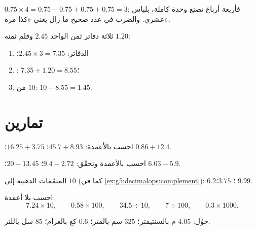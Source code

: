 \begin{example}\label{ex:g5:decimalops:mult}
$0.75 \times 4 = 0.75 + 0.75 + 0.75 + 0.75 = 3$: فأربعة أرباع تصنع
وحدة كاملة، بلباس عشري. والضرب في عدد صحيح ما زال
يعني «كذا مرة».
\end{example}

\begin{example}[التسوّق]\label{ex:g5:decimalops:shopping}
ثلاثة دفاتر ثمن الواحد $2.45$ وقلم ثمنه $1.20$:
\begin{enumerate}
  \item الدفاتر: $2.45 \times 3 = 7.35$؛
  \item {}: $7.35 + 1.20 = 8.55$؛
  \item {} من $10$: $10 - 8.55 = 1.45$.
\end{enumerate}
\end{example}

\section{تمارين}

\begin{exercise}[$\star$]\label{exo:g5:decimalops:1}
احسب بالأعمدة: $45.7 + 8.93$؛ \quad $16.25 + 3.75$؛ \quad
$0.86 + 12.4$.
\end{exercise}

\begin{exercise}[$\star$]\label{exo:g5:decimalops:2}
احسب بالأعمدة وتحقّق: $9.4 - 2.72$؛ \quad $20 - 13.45$؛
\quad $6.03 - 5.9$.
\end{exercise}

\begin{exercise}[$\star$]\label{exo:g5:decimalops:3}
المتمّمات الذهنية إلى $10$ (كما في
\cref{ex:g5:decimalops:complement}): $6.2$؛ \quad $3.75$؛ \quad
$9.99$.
\end{exercise}

\begin{exercise}[$\star$]\label{exo:g5:decimalops:4}
احسب بلا أعمدة:
\[
7.24 \times 10, \qquad
0.58 \times 100, \qquad
34.5 \div 10, \qquad
7 \div 100, \qquad
0.3 \times 1000 .
\]
\end{exercise}

\begin{exercise}[$\star$]\label{exo:g5:decimalops:5}
حوِّل: $4.05$ م بالسنتيمتر؛ \quad $325$ سم بالمتر؛ \quad $0.6$ كغ
بالغرام؛ \quad $85$ سل باللتر.
\end{exercise}

